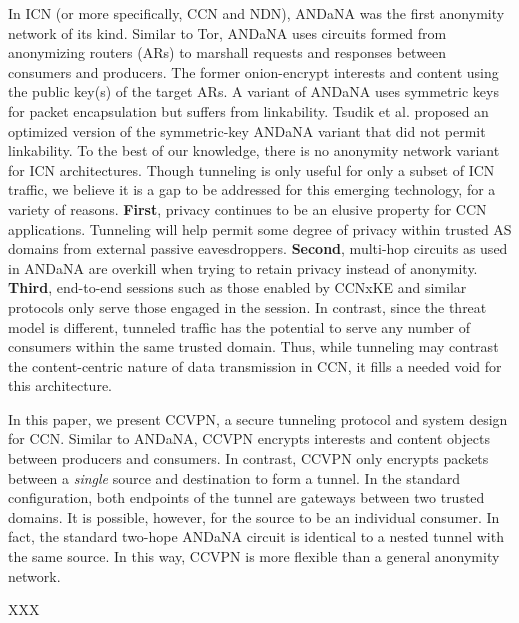 In ICN (or more specifically, CCN and NDN), ANDaNA was the first anonymity network of its
kind. Similar to Tor, ANDaNA uses circuits formed from anonymizing routers (ARs)
to marshall requests and responses between consumers and producers. The former
onion-encrypt interests and content using the public key(s) of the target ARs.
A variant of ANDaNA uses symmetric keys for packet encapsulation but suffers from
linkability. Tsudik et al. \cite{ac3n} proposed an optimized version of the symmetric-key
ANDaNA variant that did not permit linkability. To the best of our knowledge, there
is no anonymity network variant for ICN architectures. Though tunneling is only
useful for only a subset of ICN traffic, we believe it is a gap to be addressed
for this emerging technology, for a variety of reasons. {\bf First}, privacy
continues to be an elusive property for CCN applications. Tunneling will help
permit some degree of privacy within trusted AS domains from external passive
eavesdroppers. {\bf Second}, multi-hop circuits as used in ANDaNA are overkill
when trying to retain privacy instead of anonymity. {\bf Third}, end-to-end
sessions such as those enabled by CCNxKE \cite{ccnxke} and similar protocols
only serve those engaged in the session. In contrast, since the threat model is
different, tunneled traffic has the potential to serve any number of consumers
within the same trusted domain. Thus, while tunneling may contrast the content-centric
nature of data transmission in CCN, it fills a needed void for this architecture.

In this paper, we present CCVPN, a secure tunneling protocol and system design for
CCN. Similar to ANDaNA, CCVPN encrypts interests and content objects between producers
and consumers. In contrast, CCVPN only encrypts packets between a \emph{single}
source and destination to form a tunnel. In the standard configuration, both
endpoints of the tunnel are gateways between two trusted domains. It is possible,
however, for the source to be an individual consumer. In fact, the standard two-hope
ANDaNA circuit is identical to a nested tunnel with the same source. In this way,
CCVPN is more flexible than a general anonymity network.

XXX
